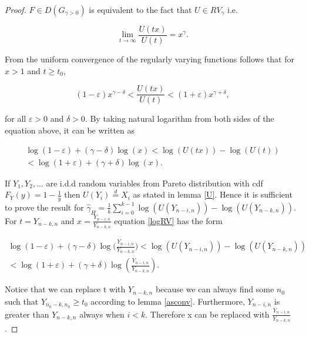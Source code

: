 \documentclass[english,12pt,a4paper,pdftex,sci,utf8]{aaltothesis} %
\begin{document}
\begin{proof}

$F \in D(G_{\gamma>0})$ is equivalent to the fact that $U \in RV_{\gamma}$ i.e.

\begin{equation*}
\lim_{t\to\infty} \frac{U(tx)}{U(t)} = x^{\gamma}.
\end{equation*}

From the uniform convergence of the regularly varying functions follows that for $x>1$ and $t \geq t_0$,

\begin{equation*}
(1-\varepsilon) x^{\gamma - \delta} < \frac{U(tx)}{U(t)} < (1+\varepsilon) x^{\gamma + \delta},
\end{equation*}

for all $\varepsilon>0$ and $\delta>0$. By taking natural logarithm from both sides of the equation above, it can be written as

\begin{equation}
\begin{split}
\log(1 - \varepsilon) + (\gamma - \delta) \log(x) < \log(U(tx)) - \log(U(t)) \\
< \log(1 + \varepsilon) + (\gamma + \delta) \log(x).
\end{split}
\label{logRV}
\end{equation}

If $Y_1, Y_2,...$ are i.d.d random variables from Pareto distribution with cdf $F_Y(y) = 1 - \frac{1}{y}$ then $U(Y_i)  \overset{d}{=} X_i$  as stated in lemma \ref{U}. Hence it is sufficient to prove the result for $ \hat{\gamma}_H =  \frac{1}{k} \sum_{i=0}^{k-1} \log(U(Y_{n-i,n})) - \log(U(Y_{n-k,n})) $. For $t = Y_{n-k,n}$ and $x =\frac{Y_{n-i,n}}{Y_{n-k,n}}$ equation \ref{logRV} has the form


\begin{equation}
\begin{split}
\log(1 - \varepsilon) + (\gamma - \delta) \log\Big(\frac{Y_{n-i,n}}{Y_{n-k,n}}\Big) < \log(U(Y_{n-i,n})) - \log(U(Y_{n-k,n})) \\
< \log(1 + \varepsilon) + (\gamma + \delta) \log(\frac{Y_{n-i,n}}{Y_{n-k,n}}).
\end{split}
\label{log}
\end{equation}

Notice that we can replace t with $Y_{n-k,n}$ because we can always find some $n_0$ such that $Y_{n_0-k,n_0} \geq t_0$ according to lemma \ref{asconv}. Furthermore, $Y_{n-i,n}$ is greater than $Y_{n-k,n}$ always when $i<k$. Therefore x can be replaced with $\frac{Y_{n-i,n}}{Y_{n-k,n}}$.


\end{proof}
\end{document}
